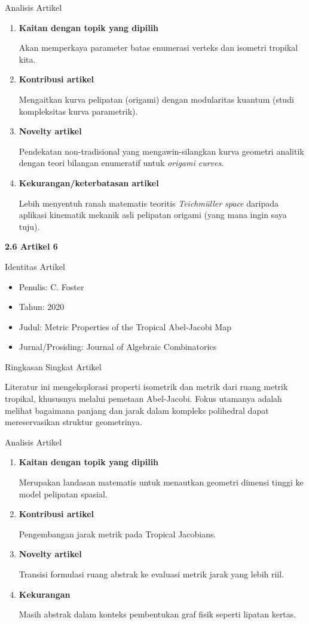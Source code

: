 \documentclass[12pt,a4paper]{article}
\begin{document}
\noindent Analisis Artikel
\begin{enumerate}
      \item \textbf{Kaitan dengan topik yang dipilih}\par
            Akan memperkaya parameter batas enumerasi verteks dan isometri tropikal kita.
      \item \textbf{Kontribusi artikel}\par
            Mengaitkan kurva pelipatan (origami) dengan modularitas kuantum (studi kompleksitas kurva parametrik).
      \item \textbf{Novelty artikel}\par
            Pendekatan non-tradisional yang mengawin-silangkan kurva geometri analitik dengan teori bilangan enumeratif untuk \textit{origami curves}.
      \item \textbf{Kekurangan/keterbatasan artikel}\par
            Lebih menyentuh ranah matematis teoritis \textit{Teichmüller space} daripada aplikasi kinematik mekanik asli pelipatan origami (yang mana ingin saya tuju).
\end{enumerate}



\newpage
\noindent\textbf{\large 2.6 Artikel 6 \cite{foster2020metric}}\par

\noindent Identitas Artikel
\begin{itemize}
      \item[-] Penulis: C. Foster
      \item[-] Tahun: 2020
      \item[-] Judul: Metric Properties of the Tropical Abel-Jacobi Map
      \item[-] Jurnal/Prosiding: Journal of Algebraic Combinatorics
\end{itemize}

\noindent Ringkasan Singkat Artikel\par
Literatur ini mengeksplorasi properti isometrik dan metrik dari ruang metrik tropikal, khususnya melalui pemetaan Abel-Jacobi. Fokus utamanya adalah melihat bagaimana panjang dan jarak dalam kompleks polihedral dapat mereservasikan struktur geometrinya.

\noindent Analisis Artikel
\begin{enumerate}
      \item \textbf{Kaitan dengan topik yang dipilih}\par Merupakan landasan matematis untuk menautkan geometri dimensi tinggi ke model pelipatan spasial.
      \item \textbf{Kontribusi artikel}\par Pengembangan jarak metrik pada Tropical Jacobians.
      \item \textbf{Novelty artikel}\par Transisi formulasi ruang abstrak ke evaluasi metrik jarak yang lebih riil.
      \item \textbf{Kekurangan}\par Masih abstrak dalam konteks pembentukan graf fisik seperti lipatan kertas.
\end{enumerate}
\end{document}
